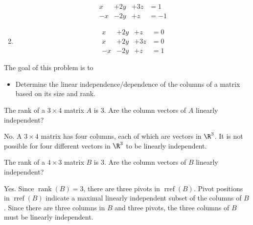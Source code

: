 \documentclass{problemset}
\DeclareMathOperator{\Rref}{rref}
\DeclareMathOperator{\Rank}{rank}
\newcommand{\rref}{\Rref}
\begin{document}
\begin{parts}
\begin{solution}
\begin{enumerate}
\begin{equation*}
\begin{array}{llll}
								x&+2y&+3z &= 1\\
								-x&-2y&+z &= -1
							\end{array}
						\end{equation*}
					\item
						\begin{equation*}
							\begin{array}{llll}
								x&+2y&+z &= 0\\
								x&+2y&+3z &= 0\\
								-x&-2y&+z &= 1
							\end{array}
						\end{equation*}
				\end{enumerate}
			\end{solution}
	\end{parts}

	\question
	\begin{annotation}
		\begin{goals}

			The goal of this problem is to
			\begin{itemize}
				\item Determine the linear independence/dependence of the columns of a matrix
					based on its size and rank.
			\end{itemize}
		\end{goals}
	\end{annotation}
	\begin{parts}
		\item The rank of a $3\times 4$ matrix $A$ is $3$.
			Are the column vectors of $A$ linearly independent?
			\begin{solution}
				No. A $3 \times 4$ matrix has four columns, each of which are
				vectors in $\R^3$. It is not possible for four different vectors
				in $\R^3$ to be linearly independent.
			\end{solution}
		\item The rank of a $4\times 3$ matrix $B$ is $3$.
			Are the column vectors of $B$ linearly independent?
			\begin{solution}
				Yes. Since $\Rank(B)=3$, there are three pivots in $\rref(B)$.
				Pivot positions in $\rref(B)$ indicate a maximal linearly
				independent subset of the columns of $B$. Since there are three
				columns in $B$ and three pivots, the three columns of $B$ must be
				linearly independent.
			\end{solution}
	\end{parts}
\end{document}
